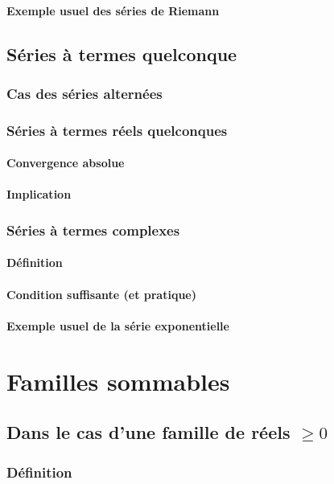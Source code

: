 \documentclass[12pt,a4paper,french]{book}
\begin{document}
			\subsubsection{Exemple usuel des séries de Riemann}
	\section{Séries à termes quelconque}
		\subsection{Cas des séries alternées}
		\subsection{Séries à termes réels quelconques}
			\subsubsection{Convergence absolue}
			\subsubsection{Implication}
		\subsection{Séries à termes complexes}
			\subsubsection{Définition}
			\subsubsection{Condition suffisante (et pratique)}
			\subsubsection{Exemple usuel de la série exponentielle}

\chapter{Familles sommables}
	\section{Dans le cas d'une famille de réels $\geqslant 0$}
		\subsection{Définition}
\end{document}
